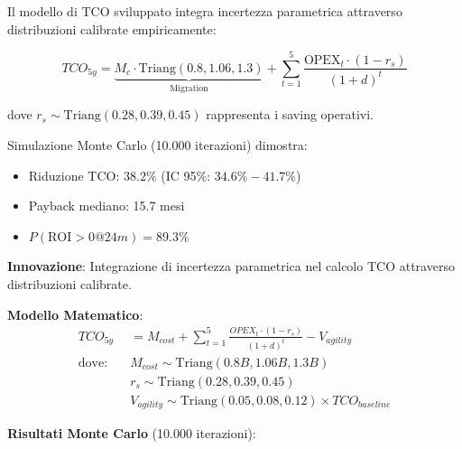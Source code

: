 \begin{refsection}
Il modello di TCO sviluppato integra incertezza parametrica attraverso 
distribuzioni calibrate empiricamente:

\begin{equation}
TCO_{5y} = \underbrace{M_c \cdot \text{Triang}(0.8, 1.06, 1.3)}_{\text{Migration}} + 
           \sum_{t=1}^{5} \frac{\text{OPEX}_t \cdot (1-r_s)}{(1+d)^t}
\end{equation}

dove $r_s \sim \text{Triang}(0.28, 0.39, 0.45)$ rappresenta i saving operativi.

\begin{tcolorbox}[colback=yellow!10!white,colframe=orange!75!black,title=Risultato Chiave]
Simulazione Monte Carlo (10.000 iterazioni) dimostra:
\begin{itemize}
\item Riduzione TCO: $38.2\%$ (IC 95\%: $34.6\%-41.7\%$)
\item Payback mediano: 15.7 mesi
\item $P(\text{ROI}>0 @ 24m) = 89.3\%$
\end{itemize}
\end{tcolorbox}
\begin{tcolorbox}[
    colback=orange!5!white,
    colframe=orange!65!black,
    title={\textbf{Innovation Box 3.1:} Modello TCO Stocastico per Cloud Migration},
    fonttitle=\bfseries,
    boxrule=1.5pt,
    arc=2mm,
    breakable
]
\textbf{Innovazione}: Integrazione di incertezza parametrica nel calcolo TCO attraverso distribuzioni calibrate.

\vspace{0.3cm}
\textbf{Modello Matematico}:
\begin{align*}
TCO_{5y} &= M_{cost} + \sum_{t=1}^{5} \frac{OPEX_t \cdot (1-r_s)}{(1+d)^t} - V_{agility} \\
\text{dove:} \quad & M_{cost} \sim \text{Triang}(0.8B, 1.06B, 1.3B) \\
& r_s \sim \text{Triang}(0.28, 0.39, 0.45) \\
& V_{agility} \sim \text{Triang}(0.05, 0.08, 0.12) \times TCO_{baseline}
\end{align*}

\vspace{0.3cm}
\textbf{Risultati Monte Carlo} (10.000 iterazioni):
\begin{center}
\end{center}


\end{tcolorbox}
\end{refsection}
